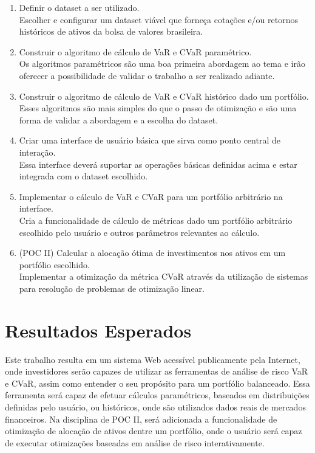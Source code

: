 \documentclass[12pt, oneside, a4paper,english,brazil]{abntex2}
\begin{document}
\begin{enumerate}
  \item Definir o dataset a ser utilizado. \\ Escolher e configurar um dataset viável que forneça cotações e/ou retornos históricos de ativos da bolsa de valores brasileira.
  \item Construir o algoritmo de cálculo de VaR e CVaR paramétrico. \\ Os algoritmos paramétricos são uma boa primeira abordagem ao tema e irão oferecer a possibilidade de validar o trabalho a ser realizado adiante.
  \item Construir o algoritmo de cálculo de VaR e CVaR histórico dado um portfólio. \\ Esses algoritmos são mais simples do que o passo de otimização e são uma forma de validar a abordagem e a escolha do dataset.
  \item Criar uma interface de usuário básica que sirva como ponto central de interação. \\ Essa interface deverá suportar as operações básicas definidas acima e estar integrada com o dataset escolhido.
  \item Implementar o cálculo de VaR e CVaR para um portfólio arbitrário na interface. \\ Cria a funcionalidade de cálculo de métricas dado um portfólio arbitrário escolhido pelo usuário e outros parâmetros relevantes ao cálculo.
  \item (POC II) Calcular a alocação ótima de investimentos nos ativos em um portfólio escolhido. \\ Implementar a otimização da métrica CVaR através da utilização de sistemas para resolução de problemas de otimização linear.
\end{enumerate}


\chapter{Resultados Esperados}

Este trabalho resulta em um sistema Web acessível publicamente pela Internet, onde investidores serão capazes de utilizar as ferramentas de análise
de risco VaR e CVaR, assim como entender o seu propósito para um portfólio balanceado. Essa ferramenta será capaz de efetuar cálculos paramétricos, baseados em distribuições definidas pelo usuário, ou históricos, onde são utilizados dados reais de mercados financeiros. Na disciplina de POC II, será adicionada a funcionalidade de otimização
de alocação de ativos dentre um portfólio, onde o usuário será capaz de executar otimizações baseadas em análise de risco interativamente.
\end{document}
